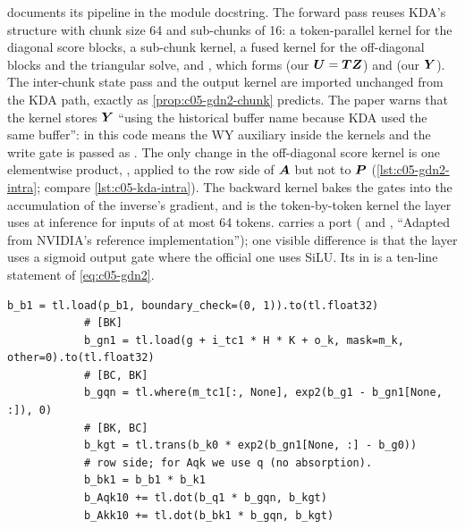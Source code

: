 \begin{implnote}[title={In the code: the GDN-2 kernels (\texttt{lit\_gpt/gdn2\_ops})}]
 documents its pipeline in
the module docstring. The forward pass reuses KDA's structure with chunk size 64 and sub-chunks
of 16: a token-parallel kernel for the diagonal score blocks, a sub-chunk kernel, a fused kernel
for the off-diagonal blocks and the triangular solve, and ,
which forms  (our $\bm{U} = \bm{T}\bm{Z}$) and 
(our $\bm{Y}$). The inter-chunk state pass and the output kernel are imported unchanged from the
KDA path, exactly as \cref{prop:c05-gdn2-chunk} predicts. The paper warns that the kernel stores
$\bm{Y}$ ``using the historical buffer name  because KDA used the same buffer'': in this
code  means the WY auxiliary inside the kernels and the write gate is passed as .
The only change in the off-diagonal score kernel is one elementwise product,
, applied to the row side of $\bm{A}$ but not to $\bm{P}$
(\cref{lst:c05-gdn2-intra}; compare \cref{lst:c05-kda-intra}). The backward kernel
 bakes the gates into the accumulation of the inverse's
gradient, and 
is the token-by-token kernel the layer uses at inference for inputs of at most 64 tokens. \fla{}
carries a port ( and
, ``Adapted from NVIDIA's
reference implementation''); one visible difference is that the \fla{} layer uses a sigmoid output
gate where the official one uses SiLU. Its  in 
is a ten-line statement of \cref{eq:c05-gdn2}.
\end{implnote}

\begin{lstlisting}[caption={Excerpt from \texttt{repos/\allowbreak{}NVlabs\_\_GatedDeltaNet-2/\allowbreak{}lit\_gpt/\allowbreak{}gdn2\_ops/\allowbreak{}chunk\_gdn2.py} (off-diagonal block of the score matrices)},label={lst:c05-gdn2-intra}]
            b_b1 = tl.load(p_b1, boundary_check=(0, 1)).to(tl.float32)
            # [BK]
            b_gn1 = tl.load(g + i_tc1 * H * K + o_k, mask=m_k, other=0).to(tl.float32)
            # [BC, BK]
            b_gqn = tl.where(m_tc1[:, None], exp2(b_g1 - b_gn1[None, :]), 0)
            # [BK, BC]
            b_kgt = tl.trans(b_k0 * exp2(b_gn1[None, :] - b_g0))
            # row side; for Aqk we use q (no absorption).
            b_bk1 = b_b1 * b_k1
            b_Aqk10 += tl.dot(b_q1 * b_gqn, b_kgt)
            b_Akk10 += tl.dot(b_bk1 * b_gqn, b_kgt)
\end{lstlisting}

